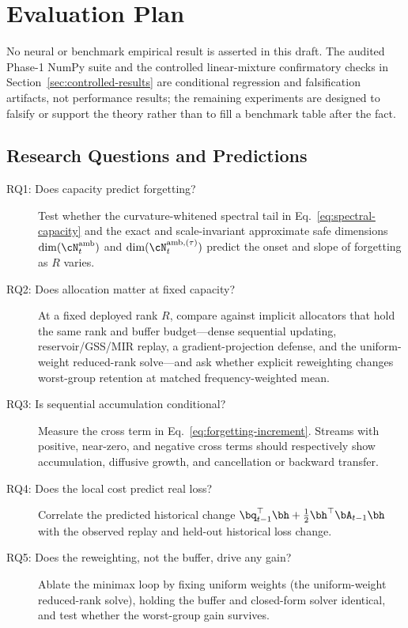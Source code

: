 \section{Evaluation Plan}
\label{sec:experiments}

No neural or benchmark empirical result is asserted in this draft. The audited
Phase-1 NumPy suite and the controlled linear-mixture confirmatory checks in
Section~\ref{sec:controlled-results} are conditional regression and
falsification artifacts, not performance results; the remaining experiments
are designed to falsify or support the theory rather than to fill a benchmark
table after the fact.

\subsection{Research Questions and Predictions}

\begin{description}
  \item[RQ1: Does capacity predict forgetting?] Test whether the
  curvature-whitened spectral tail in Eq.~\eqref{eq:spectral-capacity} and the
  exact and scale-invariant approximate safe dimensions
  $\operatorname{dim}(\cN_t^{\mathrm{amb}})$ and
  $\operatorname{dim}(\cN_t^{\mathrm{amb},(\tau)})$ predict the onset and slope of
  forgetting as $R$ varies.
  \item[RQ2: Does allocation matter at fixed capacity?] At a fixed deployed rank
  $R$, compare \method{} against implicit allocators that hold the same rank and
  buffer budget---dense sequential updating, reservoir/GSS/MIR replay, a
  gradient-projection defense, and the uniform-weight reduced-rank solve---and
  ask whether explicit reweighting changes worst-group retention at matched
  frequency-weighted mean.
  \item[RQ3: Is sequential accumulation conditional?] Measure the cross term in
  Eq.~\eqref{eq:forgetting-increment}. Streams with positive, near-zero, and
  negative cross terms should respectively show accumulation, diffusive growth,
  and cancellation or backward transfer.
  \item[RQ4: Does the local cost predict real loss?] Correlate the predicted
  historical change
  $\bq_{t-1}^\top\bh+\frac12\bh^\top\bA_{t-1}\bh$ with the observed replay and
  held-out historical loss change.
  \item[RQ5: Does the reweighting, not the buffer, drive any gain?] Ablate the
  minimax loop by fixing uniform weights (the uniform-weight reduced-rank solve),
  holding the buffer and closed-form solver identical, and test whether the
  worst-group gain survives.
\end{description}


